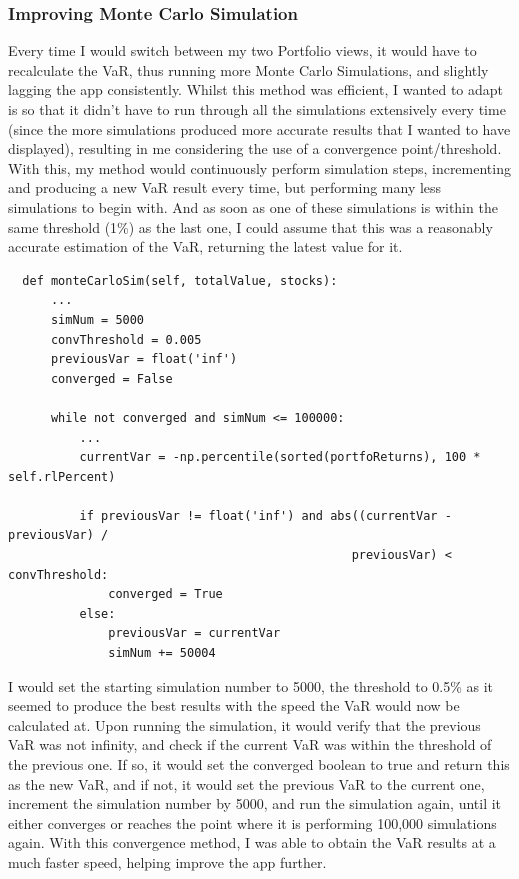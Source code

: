 \documentclass{article}
\begin{document}
\subsubsection{Improving Monte Carlo Simulation}
Every time I would switch between my two Portfolio views, it would have to recalculate the VaR, thus running more Monte Carlo Simulations, and slightly lagging the app consistently. Whilst this method was efficient, I wanted to adapt is so that it didn't have to run through all the simulations extensively every time (since the more simulations produced more accurate results that I wanted to have displayed), resulting in me considering the use of a convergence point/threshold. With this, my method would continuously perform simulation steps, incrementing and producing a new VaR result every time, but performing many less simulations to begin with. And as soon as one of these simulations is within the same threshold (1\%) as the last one, I could assume that this was a reasonably accurate estimation of the VaR, returning the latest value for it.\\\vspace{0.3cm}

\begin{verbatim}
  def monteCarloSim(self, totalValue, stocks):
      ...
      simNum = 5000
      convThreshold = 0.005
      previousVar = float('inf')
      converged = False

      while not converged and simNum <= 100000:            
          ...
          currentVar = -np.percentile(sorted(portfoReturns), 100 * self.rlPercent)

          if previousVar != float('inf') and abs((currentVar - previousVar) / 
                                                previousVar) < convThreshold:
              converged = True
          else:
              previousVar = currentVar
              simNum += 50004
\end{verbatim}

\vspace{0.3cm}
I would set the starting simulation number to 5000, the threshold to 0.5\% as it seemed to produce the best results with the speed the VaR would now be calculated at. Upon running the simulation, it would verify that the previous VaR was not infinity, and check if the current VaR was within the threshold of the previous one. If so, it would set the converged boolean to true and return this as the new VaR, and if not, it would set the previous VaR to the current one, increment the simulation number by 5000, and run the simulation again, until it either converges or reaches the point where it is performing 100,000 simulations again. With this convergence method, I was able to obtain the VaR results at a much faster speed, helping improve the app further. \\\vspace{0.3cm}
\end{document}
